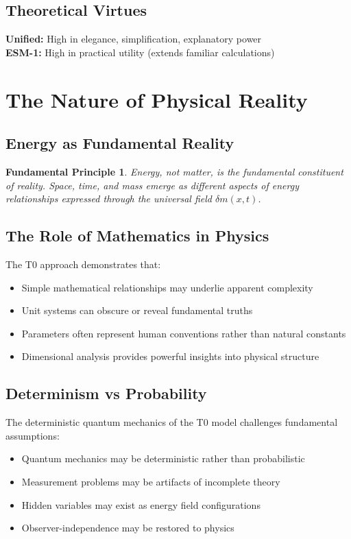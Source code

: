 \documentclass[12pt,a4paper]{report}
\newtheorem{principle}{Fundamental Principle}[chapter]
\begin{document}
	\subsection{Theoretical Virtues}
	\textbf{Unified:} High in elegance, simplification, explanatory power\\
	\textbf{ESM-1:} High in practical utility (extends familiar calculations)
	
	\section{The Nature of Physical Reality}
	
	\subsection{Energy as Fundamental Reality}
	\begin{principle}
		Energy, not matter, is the fundamental constituent of reality. Space, time, and mass emerge as different aspects of energy relationships expressed through the universal field $\delta m(x,t)$.
	\end{principle}
	
	\subsection{The Role of Mathematics in Physics}
	The T0 approach demonstrates that:
	\begin{itemize}
		\item Simple mathematical relationships may underlie apparent complexity
		\item Unit systems can obscure or reveal fundamental truths
		\item Parameters often represent human conventions rather than natural constants
		\item Dimensional analysis provides powerful insights into physical structure
	\end{itemize}
	
	\subsection{Determinism vs Probability}
	The deterministic quantum mechanics of the T0 model challenges fundamental assumptions:
	\begin{itemize}
		\item Quantum mechanics may be deterministic rather than probabilistic
		\item Measurement problems may be artifacts of incomplete theory
		\item Hidden variables may exist as energy field configurations
		\item Observer-independence may be restored to physics
	\end{itemize}
	
\end{document}
